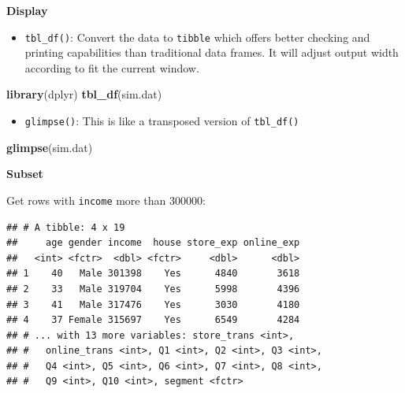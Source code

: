 \documentclass[12pt,]{krantz}
\newenvironment{Shaded}{\begin{snugshade}}{\end{snugshade}}
\newcommand{\KeywordTok}[1]{\textcolor[rgb]{0.13,0.29,0.53}{\textbf{{#1}}}}
\newcommand{\DecValTok}[1]{\textcolor[rgb]{0.00,0.00,0.81}{{#1}}}
\newcommand{\StringTok}[1]{\textcolor[rgb]{0.31,0.60,0.02}{{#1}}}
\newcommand{\NormalTok}[1]{{#1}}
\providecommand{\tightlist}{%
  \setlength{\itemsep}{0pt}\setlength{\parskip}{0pt}}
\theoremstyle{definition}
\theoremstyle{definition}
\theoremstyle{remark}
\begin{document}
\textbf{Display}

\begin{itemize}
\tightlist
\item
  \texttt{tbl\_df()}: Convert the data to \texttt{tibble} which offers
  better checking and printing capabilities than traditional data
  frames. It will adjust output width according to fit the current
  window.
\end{itemize}

\begin{Shaded}
\begin{Highlighting}[]
\KeywordTok{library}\NormalTok{(dplyr)}
\KeywordTok{tbl_df}\NormalTok{(sim.dat)}
\end{Highlighting}
\end{Shaded}

\begin{itemize}
\tightlist
\item
  \texttt{glimpse()}: This is like a transposed version of
  \texttt{tbl\_df()}
\end{itemize}

\begin{Shaded}
\begin{Highlighting}[]
\KeywordTok{glimpse}\NormalTok{(sim.dat)}
\end{Highlighting}
\end{Shaded}

\textbf{Subset}

Get rows with \texttt{income} more than 300000:

\begin{Shaded}
\end{Shaded}

\begin{verbatim}
## # A tibble: 4 x 19
##     age gender income  house store_exp online_exp
##   <int> <fctr>  <dbl> <fctr>     <dbl>      <dbl>
## 1    40   Male 301398    Yes      4840       3618
## 2    33   Male 319704    Yes      5998       4396
## 3    41   Male 317476    Yes      3030       4180
## 4    37 Female 315697    Yes      6549       4284
## # ... with 13 more variables: store_trans <int>,
## #   online_trans <int>, Q1 <int>, Q2 <int>, Q3 <int>,
## #   Q4 <int>, Q5 <int>, Q6 <int>, Q7 <int>, Q8 <int>,
## #   Q9 <int>, Q10 <int>, segment <fctr>
\end{verbatim}
\end{document}
